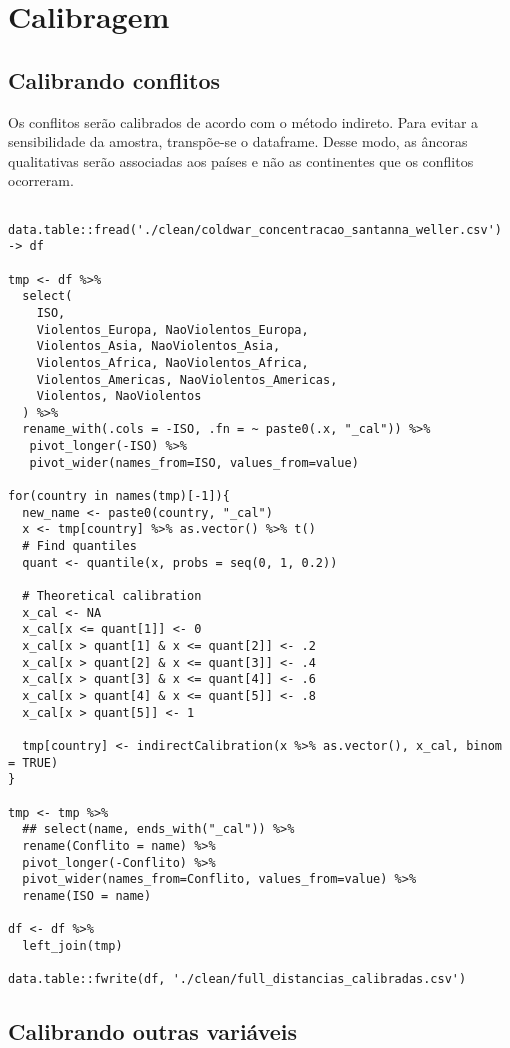 \documentclass[11pt]{article}
\begin{document}
\section*{Calibragem}
\label{sec:orgadee556}

\subsection*{Calibrando conflitos}
\label{sec:org0368d69}

Os conflitos serão calibrados de acordo com o método indireto.
Para evitar a sensibilidade da amostra, transpõe-se o dataframe.
Desse modo, as âncoras qualitativas serão associadas aos países e não as continentes que os conflitos ocorreram.

\begin{verbatim}

data.table::fread('./clean/coldwar_concentracao_santanna_weller.csv') -> df

tmp <- df %>%
  select(
    ISO,
    Violentos_Europa, NaoViolentos_Europa,
    Violentos_Asia, NaoViolentos_Asia,
    Violentos_Africa, NaoViolentos_Africa,
    Violentos_Americas, NaoViolentos_Americas,
    Violentos, NaoViolentos
  ) %>%
  rename_with(.cols = -ISO, .fn = ~ paste0(.x, "_cal")) %>%
   pivot_longer(-ISO) %>%
   pivot_wider(names_from=ISO, values_from=value)

for(country in names(tmp)[-1]){
  new_name <- paste0(country, "_cal")
  x <- tmp[country] %>% as.vector() %>% t()
  # Find quantiles
  quant <- quantile(x, probs = seq(0, 1, 0.2))

  # Theoretical calibration
  x_cal <- NA
  x_cal[x <= quant[1]] <- 0
  x_cal[x > quant[1] & x <= quant[2]] <- .2
  x_cal[x > quant[2] & x <= quant[3]] <- .4
  x_cal[x > quant[3] & x <= quant[4]] <- .6
  x_cal[x > quant[4] & x <= quant[5]] <- .8
  x_cal[x > quant[5]] <- 1

  tmp[country] <- indirectCalibration(x %>% as.vector(), x_cal, binom = TRUE)
}

tmp <- tmp %>%
  ## select(name, ends_with("_cal")) %>%
  rename(Conflito = name) %>%
  pivot_longer(-Conflito) %>%
  pivot_wider(names_from=Conflito, values_from=value) %>%
  rename(ISO = name)

df <- df %>%
  left_join(tmp)

data.table::fwrite(df, './clean/full_distancias_calibradas.csv')
\end{verbatim}

\subsection*{Calibrando outras variáveis}
\label{sec:org91d96f4}
\end{document}
